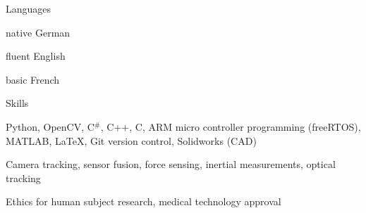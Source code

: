 

\begin{cventries}

  \cventry
    {Languages} %
    { } %
    { } %
    { } %
    {
      \begin{cvitems} %
      \item{native German}
      \item{fluent English}
      \item{basic French}
      \end{cvitems}
    }
    
     \cventry
    {Skills} %
    { } %
    { } %
    { } %
    {
      \begin{cvitems} %
      \item{Python, OpenCV, C$^\#$, C++, C, ARM micro controller programming (freeRTOS), MATLAB, LaTeX, Git version control, Solidworks (CAD)}
      \item{Camera tracking, sensor fusion, force sensing, inertial measurements, optical tracking}
      \item{Ethics for human subject research, medical technology approval}
      \end{cvitems}
    }

\end{cventries}

